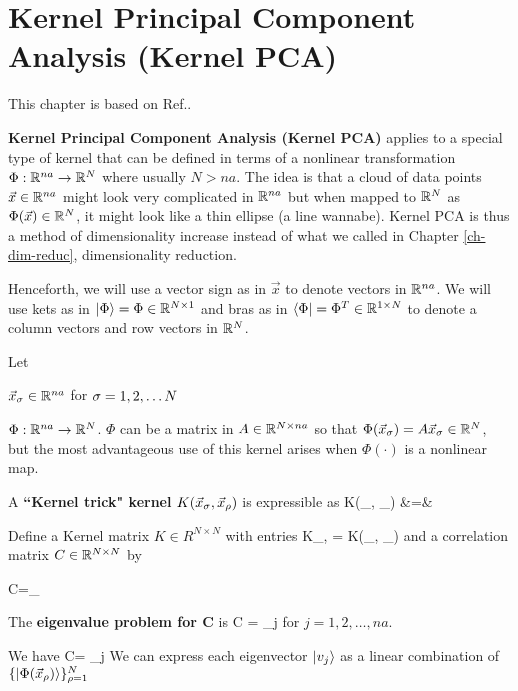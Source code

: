 \chapter{Kernel Principal Component Analysis (Kernel PCA)}
\label{ch-kernel-pca}

This chapter is based on Ref.\cite{wiki-kernel-pca}.

{\bf Kernel Principal Component Analysis (Kernel PCA)} applies
to a special type
of kernel that can be defined in terms of
a nonlinear transformation $\Phi:{ \mathbb{R}}^{na}\rightarrow { \mathbb{R}}^{N}$
where usually $N>na$. The idea is that a cloud of data points 
$\vec{x}\in{ \mathbb{R}}^{na}$ might look very complicated 
in ${ \mathbb{R}}^{na}$ but
when mapped to ${ \mathbb{R}}^N$ as $\Phi(\vec{x})\in{ \mathbb{R}}^N$, it might look like a thin ellipse (a line wannabe). Kernel PCA is thus a method of dimensionality increase instead of what
we called in Chapter \ref{ch-dim-reduc}, dimensionality
reduction.  

Henceforth, we will use a vector sign
as in $\vec{x}$ to denote 
vectors in ${ \mathbb{R}}^{na}$. We will use kets as in  $|\Phi\rangle=\Phi\in { \mathbb{R}}^{N\times 1}$ and bras as in $\langle\Phi|=\Phi^T\in { \mathbb{R}}^{1\times N}$ to denote a column vectors and row vectors in ${ \mathbb{R}}^N$.

Let

$\vec{x}_\sigma\in { \mathbb{R}}^{na}$ for  $\sigma=1,2,\ldots N$

$\Phi: { \mathbb{R}}^{na}\rightarrow { \mathbb{R}}^N$. $\Phi$ 
can be a matrix in $A\in { \mathbb{R}}^{N\times na}$ so that $
\Phi (\vec{x}_\sigma)=A\vec{x}_\sigma\in{ \mathbb{R}}^N$,
but the most advantageous use of this
kernel arises when $\Phi(\cdot)$ is a nonlinear map.
 
A {\bf ``Kernel trick" kernel} $K(\vec{x}_\sigma, \vec{x}_{\rho})$ is expressible as 
\beqa
K(_\s, _{\rho}) &=& 
\eeqa

Define a Kernel matrix $K\in R^{N\times N}$ with entries
\beq
K_{\s, \rho} = K(_\s, _{\rho})
\eeq
and a correlation matrix $C\in { \mathbb{R}}^{N\times N}$ by

\beqa
C=\sum_\s 
{}
\eeqa

The {\bf eigenvalue problem for C} is
\beq
C  = \lam_j 
\eeq
for $j=1,2, \ldots, na$.


We have
\beq
{} C=
\lam_j
\eeq
We can express each eigenvector $|v_j\rangle$
as a linear combination of  
$\{|\Phi(\vec{x}_\rho)\rangle\}_{\rho=1}^N$


